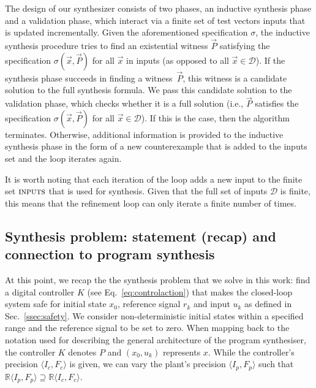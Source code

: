 \documentclass[runningheads,a4paper]{llncs}
\begin{document}
The design of our synthesizer consists of two phases, an inductive
synthesis phase and a validation phase, which interact via a finite
set of test vectors {\sc inputs} that is updated incrementally.  Given
the aforementioned specification $\sigma$, the inductive synthesis
procedure tries to find an existential witness $\vec{P}$ satisfying
the specification $\sigma(\vec{x}, \vec{P})$ for all $\vec{x}$ in {\sc
  inputs} (as opposed to all $\vec{x} \in \mathcal{D}$).
%
If the synthesis phase succeeds in finding a witness~$\vec{P}$, this
witness is a candidate solution to the full synthesis formula.  We
pass this candidate solution to the validation phase, which checks
whether it is a full solution (i.e., $\vec{P}$ satisfies the
specification $\sigma(\vec{x}, \vec{P})$ for all
$\vec{x}\in\mathcal{D}$).  If this is the case, then the algorithm
terminates.  Otherwise, additional information is provided to the
inductive synthesis phase in the form of a new counterexample that is
added to the {\sc inputs} set and the loop iterates again.

It is worth noting that each iteration of the loop adds a new input to
the finite set $\text{\sc inputs}$ that is used for synthesis.  Given
that the full set of inputs $\mathcal{D}$ is finite, this means that
the refinement loop can only iterate a finite number of times.

\subsection{Synthesis problem: statement (recap) and connection to program synthesis}


At this point, we recap the the synthesis problem that we solve in this work:
find a digital controller $K$ (see Eq.~\ref{eq:controlaction})
that makes the closed-loop system safe for 
initial state $x_0$, reference signal $r_k$ and input $u_k$
as defined in Sec.~\ref{ssec:safety}. 
We consider non-deterministic initial states within a specified range
and the reference signal to be set to zero.  
When mapping back to the notation used for describing the general architecture 
of the program synthesiser, the controller $K$ denotes $P$ and 
$(x_0, u_k)$ represents $x$. 
While the controller's precision $\langle I_c,F_c\rangle$ is given, 
we can vary the plant's precision $\langle I_p,F_p\rangle$ such that 
$\mathbb{R}\langle I_p,F_p \rangle \supseteq \mathbb{R}\langle I_c,F_c \rangle$.
\end{document}
